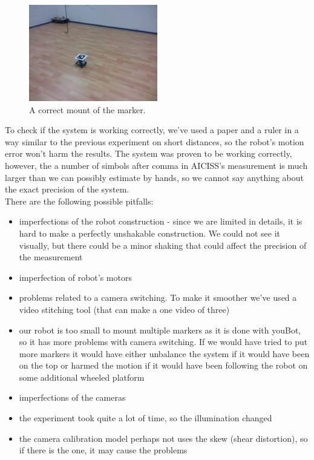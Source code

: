 \documentclass[a4paper, 12pt]{article}
\begin{document}
\begin{figure}[h]
  \centering
  \caption{A correct mount of the marker.\label{fig:rightMarker}}
  \includegraphics[width=0.5\textwidth]{rightMarker}
\end{figure}

To check if the system is working correctly, we've used a paper and a ruler in a way similar to the previous experiment on short distances, so the robot's motion error won't harm the results. The system was proven to be working correctly, however, the a number of simbols after comma in AICISS's measurement is much larger than we can possibly estimate by hands, so we cannot say anything about the exact precision of the system. \\

There are the following possible pitfalls:
\begin{itemize}
\item imperfections of the robot construction - since we are limited in details, it is hard to make a perfectly unshakable construction. We could not see it visually, but there could be a minor shaking that could affect the precision of the measurement
\item imperfection of robot's motors
\item problems related to a camera switching. To make it smoother we've used a video stitching tool (that can make a one video of three)
\item our robot is too small to mount multiple markers as it is done with youBot, so it has more problems with camera switching. If we would have tried to put more markers it would have either unbalance the system if it would have been on the top or harmed the motion if it would have been following the robot on some additional wheeled platform
\item imperfections of the cameras
\item the experiment took quite a lot of time, so the illumination changed
\item the camera calibration model perhaps not uses the skew (shear distortion), so if there is the one, it may cause the problems
\end{itemize}
\end{document}
